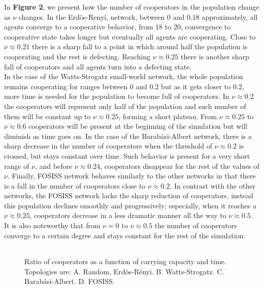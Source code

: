 \documentclass{bmcart}
\def\texttt{[image: ]}
\begin{document}
In \textbf{Figure 2}, we present how the number of cooperators in the population
change as $\nu$ changes. In the Erd\"{o}s-Reny\'i, network, between $0$ and
$0.18$ approximately, all agents converge to a cooperative behavior, from $18$
to $20$, convergence to cooperative state takes longer but eventually all agents
are cooperating. Close to $\nu \approx 0.21$ there is a sharp fall to a point in
which around half the population is cooperating and the rest is
defecting. Reaching $\nu \approx 0.25$ there is another sharp fall of
cooperators and all agents turn into a defecting state.\\


In the case of the Watts-Strogatz small-world network, the whole
population remains cooperating for ranges between $0$ and $0.2$ but as
it gets closer to $0.2$, more time is needed for the population to
become full of cooperators. In $\nu \approx 0.2$ the cooperators will
represent only half of the population and such number of them will be
constant up to $\nu \approx 0.25$, forming a short plateau. From
$\nu \approx 0.25$ to $\nu \approx 0.6$ cooperators will be present at
the beginning of the simulation but will diminish as time goes on.  In
the case of the Barab\'asi-Albert network, there is a sharp decrease
in the number of cooperators when the threshold of $\nu \approx 0.2$
is crossed, but stays constant over time. Such behavior is present for
a very short range of $\nu$, and before $\nu \approx 0.24$,
cooperators disappear for the rest of the values of $\nu$. Finally, FOSISS
network behaves similarly to the other networks in that there is a
fall in the number of cooperators close to $\nu \approx 0.2$. In
contrast with the other networks, the FOSISS network lacks the sharp
reduction of cooperators, instead this population declines smoothly
and progressively; especially, when it reaches a $\nu \approx 0.25$,
cooperators decrease in a less dramatic manner all the way to
$\nu \approx 0.5$. It is also noteworthy that from $\nu = 0$ to
$\nu \approx 0.5$ the number of cooperators converge to a certain
degree and stays constant for the rest of the simulation.\\


\begin{figure} [h!]
\centering
\begin{tabular}{cc}
\end{tabular}
\caption{Ratio of cooperators as a function of carrying capacity and time. Topologies are: A. Random, Erd\"{o}s-R\'enyi. B. Watts-Strogatz. C. Barab\'asi-Albert. D. FOSISS.
}\label{CD}
\end{figure}
\end{document}

